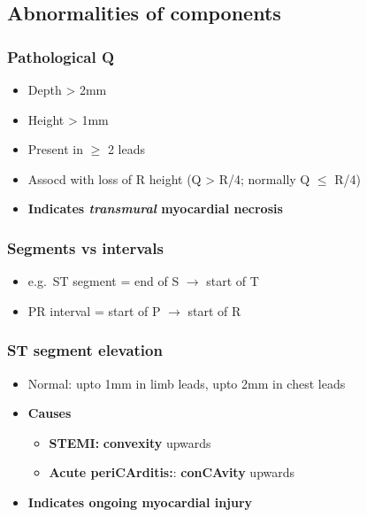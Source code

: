 \documentclass[
  12pt,
]{memoir}
\providecommand{\tightlist}{%
  \setlength{\itemsep}{0pt}\setlength{\parskip}{0pt}}
\begin{document}
\hypertarget{abnormalities-of-components}{%
\subsection{Abnormalities of
components}\label{abnormalities-of-components}}

\hypertarget{pathological-q}{%
\subsubsection{Pathological Q}\label{pathological-q}}

\begin{itemize}
\tightlist
\item
  Depth \textgreater{} 2mm
\item
  Height \textgreater{} 1mm
\item
  Present in \(\ge\) 2 leads
\item
  Assocd with loss of R height (Q \textgreater{} R/4; normally Q \(\le\)
  R/4)
\item
  \textbf{Indicates \emph{transmural} myocardial necrosis}
\end{itemize}

\hypertarget{segments-vs-intervals}{%
\subsubsection{Segments vs intervals}\label{segments-vs-intervals}}

\begin{itemize}
\tightlist
\item
  e.g.~ST segment = end of S \(\rightarrow\) start of T
\item
  PR interval = start of P \(\rightarrow\) start of R
\end{itemize}

\hypertarget{st-segment-elevation}{%
\subsubsection{ST segment elevation}\label{st-segment-elevation}}

\begin{itemize}
\tightlist
\item
  Normal: upto 1mm in limb leads, upto 2mm in chest leads
\item
  \textbf{Causes}

  \begin{itemize}
  \tightlist
  \item
    \textbf{STEMI:} \textbf{convexity} upwards
  \item
    \textbf{Acute periCArditis:}: \textbf{conCAvity} upwards
  \end{itemize}
\item
  \textbf{Indicates ongoing myocardial injury}
\end{itemize}
\end{document}
